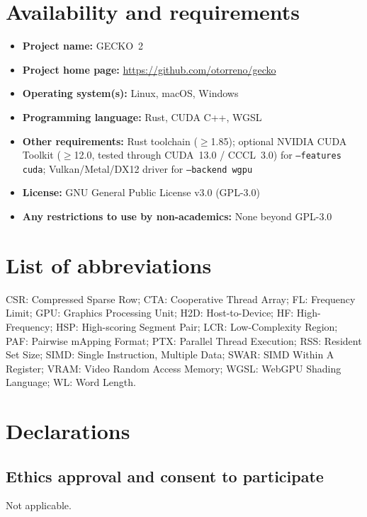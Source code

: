 \documentclass[pdflatex,sn-vancouver,Numbered]{sn-jnl}
\begin{document}
\backmatter

\section*{Availability and requirements}
\begin{itemize}
    \item \textbf{Project name:} GECKO~2
    \item \textbf{Project home page:} \url{https://github.com/otorreno/gecko}
    \item \textbf{Operating system(s):} Linux, macOS, Windows
    \item \textbf{Programming language:} Rust, CUDA C++, WGSL
    \item \textbf{Other requirements:} Rust toolchain ($\ge$1.85); optional NVIDIA CUDA Toolkit ($\ge$12.0, tested through CUDA~13.0 / CCCL~3.0) for \texttt{--features cuda}; Vulkan/Metal/DX12 driver for \texttt{--backend wgpu}
    \item \textbf{License:} GNU General Public License v3.0 (GPL-3.0)
    \item \textbf{Any restrictions to use by non-academics:} None beyond GPL-3.0
\end{itemize}

\section*{List of abbreviations}
CSR: Compressed Sparse Row; CTA: Cooperative Thread Array; FL: Frequency Limit; GPU: Graphics Processing Unit; H2D: Host-to-Device; HF: High-Frequency; HSP: High-scoring Segment Pair; LCR: Low-Complexity Region; PAF: Pairwise mApping Format; PTX: Parallel Thread Execution; RSS: Resident Set Size; SIMD: Single Instruction, Multiple Data; SWAR: SIMD Within A Register; VRAM: Video Random Access Memory; WGSL: WebGPU Shading Language; WL: Word Length.

\section*{Declarations}

\subsection*{Ethics approval and consent to participate}
Not applicable.
\end{document}
